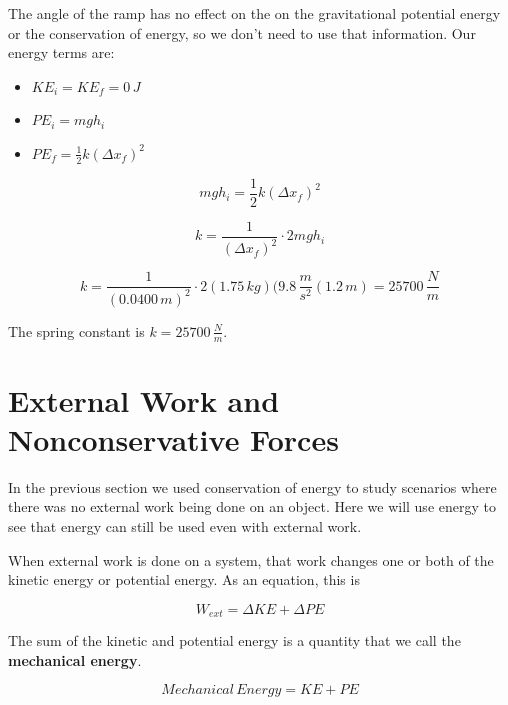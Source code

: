 \documentclass[12pt]{book}
\begin{document}
\begin{exampleblock}
The angle of the ramp has no effect on the on the gravitational potential energy or the conservation of energy, so we don't need to use that information. Our energy terms are:

\begin{itemize}
\item $KE_i = KE_f = 0 \, J$
\item $PE_i = mgh_i$
\item $PE_f = \frac{1}{2} k (\Delta x_f)^2$
\end{itemize}

\begin{equation}
mgh_i = \frac{1}{2} k (\Delta x_f)^2
\end{equation}

\begin{equation}
k = \frac{1}{(\Delta x_f)^2} \cdot 2mgh_i
\end{equation}

\begin{equation}
k = \frac{1}{(0.0400 \, m)^2} \cdot 2 (1.75 \, kg) (9.8 \, \frac{m}{s^2} (1.2 \, m) = 25700 \, \frac{N}{m}
\end{equation}

The spring constant is $k = 25700 \, \frac{N}{m}$.

\end{exampleblock}

\section{External Work and Nonconservative Forces}

In the previous section we used conservation of energy to study scenarios where there was no external work being done on an object. Here we will use energy to see that energy can still be used even with external work.

When external work is done on a system, that work changes one or both of the kinetic energy or potential energy. As an equation, this is

\begin{equation}
W_{ext} = \Delta KE + \Delta PE
\label{dME}
\end{equation}

The sum of the kinetic and potential energy is a quantity that we call the \textbf{mechanical energy}.

\begin{equation}
Mechanical \, Energy = KE + PE
\end{equation}
\end{document}
